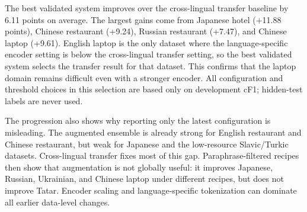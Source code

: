 \documentclass[runningheads]{llncs}
\begin{document}
\begin{table}[t]
\centering
\caption{Validated development cF1 after each main configuration
stage. When a stage does not change a dataset, the previous validated
score is carried forward; ``--'' denotes not evaluated or not used.}
\label{tab:versions}
\end{table}

The best validated system improves over the cross-lingual transfer
baseline by 6.11 points on average. The largest gains come from Japanese hotel (+11.88 points), Chinese
restaurant (+9.24), Russian restaurant (+7.47), and Chinese laptop
(+9.61). English laptop is the only dataset where the language-specific
encoder setting is below the cross-lingual transfer setting, so the best
validated system selects the transfer result for that dataset. This confirms that the
laptop domain remains difficult even with a stronger encoder. All
configuration and threshold choices in this selection are based only on
development cF1; hidden-test labels are never used.

The progression also shows why reporting only the latest configuration
is misleading. The augmented ensemble is already strong for English
restaurant and Chinese restaurant, but weak for Japanese and the
low-resource Slavic/Turkic datasets. Cross-lingual transfer fixes most
of this gap. Paraphrase-filtered recipes then show that augmentation is
not globally useful: it improves Japanese, Russian, Ukrainian, and
Chinese laptop under different recipes, but does not improve Tatar.
Encoder scaling and language-specific tokenization can dominate all
earlier data-level changes.
\end{document}
